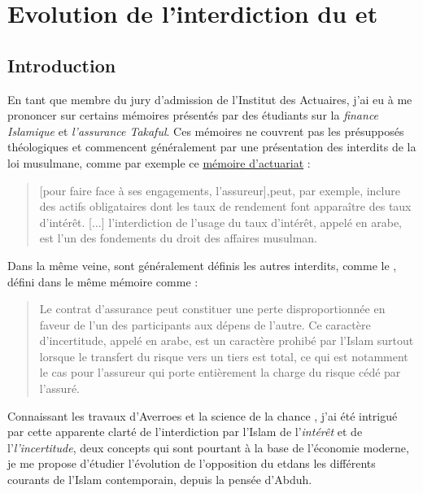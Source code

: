 \chapter{Evolution de l'interdiction du \riba et \gharar}


\section{Introduction}

En tant que membre du jury d'admission de l'Institut des Actuaires, j'ai eu à me prononcer sur certains mémoires présentés par des étudiants sur la \textit{finance Islamique} et \textit{l'assurance Takaful}. Ces mémoires ne couvrent pas les présupposés théologiques et commencent généralement par une présentation des interdits de la loi musulmane, comme par exemple ce \href{http://www.ressources-actuarielles.net/EXT/ISFA/1226-02.nsf/0/8c814ff5f2bae57ec1257e1a004407b6/\%24FILE/Memoire_ISFA_Tontines_et_Takaful_Bendimerad_Version_avec_Couverture.pdf}{mémoire d'actuariat} : 
\begin{quote}
     [pour faire face à ses  engagements, l'assureur],peut, par exemple, inclure des actifs obligataires dont les taux de rendement font apparaître des taux d'intérêt. [...] l'interdiction de l'usage du taux d'intérêt, appelé \textit{\riba} en arabe, est l'un des fondements du droit des affaires musulman. 
\end{quote}
Dans la même veine, sont généralement définis les autres interdits, comme le \gharar, défini dans le même mémoire comme : 
\begin{quote}
    Le contrat d'assurance peut constituer une perte disproportionnée en faveur de l'un des participants aux dépens de l'autre. Ce caractère d'incertitude, appelé \gharar en arabe, est un caractère prohibé par l'Islam surtout lorsque le transfert du risque vers un tiers est total, ce qui est notamment le cas pour l'assureur qui porte entièrement la charge du risque cédé par l'assuré. 
\end{quote}


Connaissant les travaux d'Averroes et la science de la chance , j'ai été intrigué par cette apparente clarté de l'interdiction par l'Islam de l'\textit{intérêt} et de l'\textit{l'incertitude}, deux concepts qui sont pourtant à la base de l'économie moderne, je me propose d'étudier l'évolution de l'opposition du {\riba} et\gharar dans les différents courants de l'Islam contemporain, depuis la pensée d'Abduh. 


